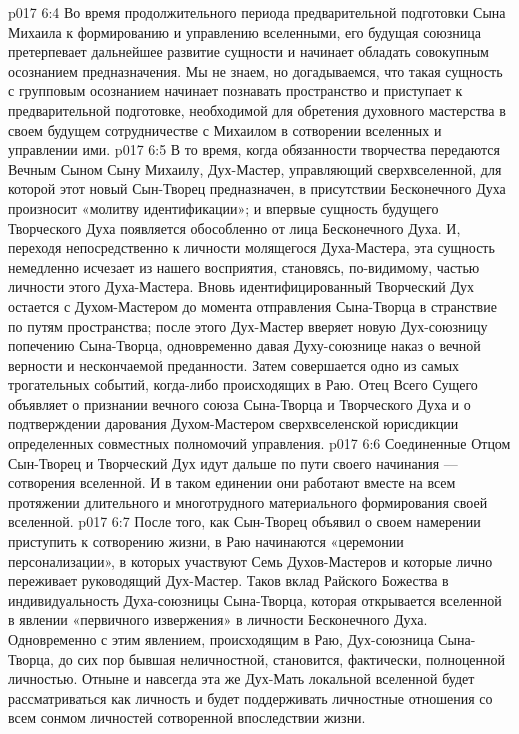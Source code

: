 \vs p017 6:4 \bibnobreakspace {} Во время продолжительного периода предварительной подготовки Сына Михаила к формированию и управлению вселенными, его будущая союзница претерпевает дальнейшее развитие сущности и начинает обладать совокупным осознанием предназначения. Мы не знаем, но догадываемся, что такая сущность с групповым осознанием начинает познавать пространство и приступает к предварительной подготовке, необходимой для обретения духовного мастерства в своем будущем сотрудничестве с Михаилом в сотворении вселенных и управлении ими.
\vs p017 6:5 \bibnobreakspace {} В то время, когда обязанности творчества передаются Вечным Сыном Сыну Михаилу, Дух\hyp{}Мастер, управляющий сверхвселенной, для которой этот новый Сын\hyp{}Творец предназначен, в присутствии Бесконечного Духа произносит «молитву идентификации»; и впервые сущность будущего Творческого Духа появляется обособленно от лица Бесконечного Духа. И, переходя непосредственно к личности молящегося Духа\hyp{}Мастера, эта сущность немедленно исчезает из нашего восприятия, становясь, по\hyp{}видимому, частью личности этого Духа\hyp{}Мастера. Вновь идентифицированный Творческий Дух остается с Духом\hyp{}Мастером до момента отправления Сына\hyp{}Творца в странствие по путям пространства; после этого Дух\hyp{}Мастер вверяет новую Дух\hyp{}союзницу попечению Сына\hyp{}Творца, одновременно давая Духу\hyp{}союзнице наказ о вечной верности и нескончаемой преданности. Затем совершается одно из самых трогательных событий, когда\hyp{}либо происходящих в Раю. Отец Всего Сущего объявляет о признании вечного союза Сына\hyp{}Творца и Творческого Духа и о подтверждении дарования Духом\hyp{}Мастером сверхвселенской юрисдикции определенных совместных полномочий управления.
\vs p017 6:6 Соединенные Отцом Сын\hyp{}Творец и Творческий Дух идут дальше по пути своего начинания --- сотворения вселенной. И в таком единении они работают вместе на всем протяжении длительного и многотрудного материального формирования своей вселенной.
\vs p017 6:7 \bibnobreakspace {} После того, как Сын\hyp{}Творец объявил о своем намерении приступить к сотворению жизни, в Раю начинаются «церемонии персонализации», в которых участвуют Семь Духов\hyp{}Мастеров и которые лично переживает руководящий Дух\hyp{}Мастер. Таков вклад Райского Божества в индивидуальность Духа\hyp{}союзницы Сына\hyp{}Творца, которая открывается вселенной в явлении «первичного извержения» в личности Бесконечного Духа. Одновременно с этим явлением, происходящим в Раю, Дух\hyp{}союзница Сына\hyp{}Творца, до сих пор бывшая неличностной, становится, фактически, полноценной личностью. Отныне и навсегда эта же Дух\hyp{}Мать локальной вселенной будет рассматриваться как личность и будет поддерживать личностные отношения со всем сонмом личностей сотворенной впоследствии жизни.
